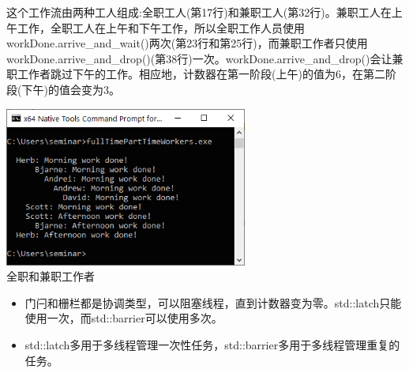 这个工作流由两种工人组成:全职工人(第17行)和兼职工人(第32行)。兼职工人在上午工作，全职工人在上午和下午工作，所以全职工作人员使用workDone.arrive\_and\_wait()两次(第23行和第25行)，而兼职工作者只使用workDone.arrive\_and\_drop()(第38行)一次。workDone.arrive\_and\_drop()会让兼职工作者跳过下午的工作。相应地，计数器在第一阶段(上午)的值为6，在第二阶段(下午)的值会变为3。

\begin{center}
\includegraphics[width=0.6\textwidth]{content/3/chapter6/images/21.png}\\
全职和兼职工作者
\end{center}

\begin{tcolorbox}[breakable,enhanced jigsaw,colback=mygreen!5!white,colframe=mygreen!75!black,title={总结}]
	
\begin{itemize}
\item 
门闩和栅栏都是协调类型，可以阻塞线程，直到计数器变为零。std::latch只能使用一次，而std::barrier可以使用多次。

\item 
std::latch多用于多线程管理一次性任务，std::barrier多用于多线程管理重复的任务。
\end{itemize}
	
\end{tcolorbox}

\newpage














